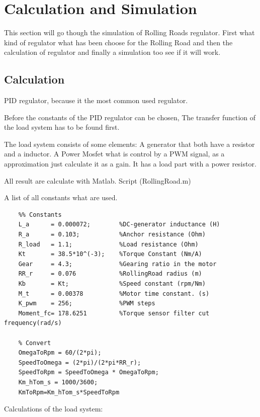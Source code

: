\newpage
\section{Calculation and Simulation} %
\label{sec:Calculation_and_Simulation}

This section will go though the simulation of Rolling Roads regulator. First what kind of regulator what has been choose for the Rolling Road and then the calculation of regulator and finally a simulation too see if it will work.

\subsection{Calculation}

PID regulator, because it the most common used regulator.

Before the constants of the PID regulator can be chosen, The transfer function of the load system has to be found first.

The load system consists of some elements: A generator that both have a resistor and a inductor. A Power Mosfet what is control by a PWM signal, as a approximation just calculate it as a gain. It has a load part with a power resistor.

All result are calculate with Matlab. Script (RollingRoad.m)   

A list of all constants what are used.
\lstset{language=MATLAB}
\begin{lstlisting}
	%% Constants
	L_a      = 0.000072;        %DC-generator inductance (H)
	R_a      = 0.103;           %Anchor resistance (Ohm)
	R_load   = 1.1;             %Load resistance (Ohm)
	Kt       = 38.5*10^(-3);    %Torque Constant (Nm/A)
	Gear     = 4.3;             %Gearing ratio in the motor
	RR_r     = 0.076            %RollingRoad radius (m)
	Kb       = Kt;              %Speed constant (rpm/Nm)
	M_t      = 0.00378          %Motor time constant. (s)
	K_pwm    = 256;             %PWM steps 
	Moment_fc= 178.6251			%Torque sensor filter cut frequency(rad/s)
	
	% Convert 
	OmegaToRpm = 60/(2*pi);
	SpeedToOmega = (2*pi)/(2*pi*RR_r);
	SpeedToRpm = SpeedToOmega * OmegaToRpm;
	Km_hTom_s = 1000/3600;
	KmToRpm=Km_hTom_s*SpeedToRpm
\end{lstlisting} 

Calculations of the load system:

